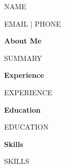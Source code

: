 \documentclass{article}
\begin{document}
{\Huge {{NAME}}}

{{EMAIL}} | {{PHONE}}

\vspace{0.3cm}

\textbf{About Me}

{{SUMMARY}}

\textbf{Experience}

{{EXPERIENCE}}

\textbf{Education}

{{EDUCATION}}

\textbf{Skills}

{{SKILLS}}
\end{document}
